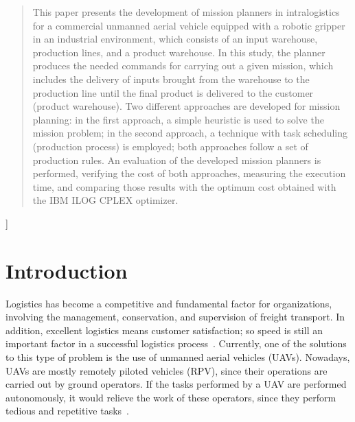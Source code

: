 \documentclass[conference,harvard,brazil,english]{sbatex}
\begin{document}
\begin{abstract}
This paper presents the development of mission planners in intralogistics for a commercial unmanned aerial vehicle equipped with a robotic gripper in an industrial environment, which consists of an input warehouse, production lines, and a product warehouse. In this study, the planner produces the needed commands for carrying out a given mission, which includes the delivery of inputs brought from the warehouse to the production line until the final product is delivered to the customer (product warehouse). Two different approaches are developed for mission planning: in the first approach, a simple heuristic is used to solve the mission problem; in the second approach, a technique with task scheduling (production process) is employed; both approaches follow a set of production rules. An evaluation of the developed mission planners is performed, verifying the cost of both approaches, measuring the execution time, and comparing those results with the optimum cost obtained with the IBM ILOG CPLEX optimizer.
\end{abstract}

]


\section{Introduction}
\label{sec:introduction}


Logistics has become a competitive and fundamental factor for organizations, involving the management, conservation, and supervision of freight transport. In addition, excellent logistics means customer satisfaction; so speed is still an important factor in a successful logistics process~\cite{drone4logistic}. Currently, one of the solutions to this type of problem is the use of unmanned aerial vehicles (UAVs). Nowadays, UAVs are mostly remotely piloted vehicles (RPV), since their operations are carried out by ground operators. If the tasks performed by a UAV are performed autonomously, it would relieve the work of these operators, since they perform tedious and repetitive tasks~\cite{pascarella2013autonomic}.
\end{document}
